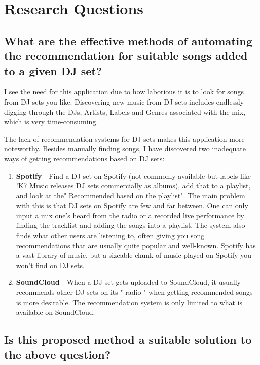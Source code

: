\documentclass[11pt,titlepage,oneside]{book}
\begin{document}
	
\section{Research Questions}
	\subsection{What are the effective methods of automating the recommendation for suitable songs added to a given DJ set?}
	
	I see the need for this application due to how laborious it is to look for songs from DJ sets you like. Discovering new music from DJ sets includes endlessly digging through the DJs, Artists, Labels and Genres associated with the mix, which is very time-consuming. 
	
	\begin{flushleft}
		The lack of recommendation systems for DJ sets makes this application more noteworthy. Besides manually finding songs, I have discovered two inadequate ways of getting recommendations based on DJ sets:
	\end{flushleft}
	
	\begin{enumerate}
		
		\item \textbf{Spotify }- Find a DJ set on Spotify (not commonly available but labels like !K7 Music releases DJ sets commercially as albums), add that to a playlist, and look at the" Recommended based on the playlist". The main problem with this is that DJ sets on Spotify are few and far between. One can only input a mix one's heard from the radio or a recorded live performance by finding the tracklist and adding the songs into a playlist. The system also finds what other users are listening to, often giving you song recommendations that are usually quite popular and well-known. Spotify has a vast library of music, but a sizeable chunk of music played on Spotify you won't find on DJ sets. 
		
		\item \textbf{SoundCloud }- When a DJ set gets uploaded to SoundCloud, it usually recommends other DJ sets on its " radio " when getting recommended songs is more desirable. The recommendation system is only limited to what is available on SoundCloud.
	\end{enumerate}

	\subsection{Is this proposed method a suitable solution to the above question?}
	
\end{document}
